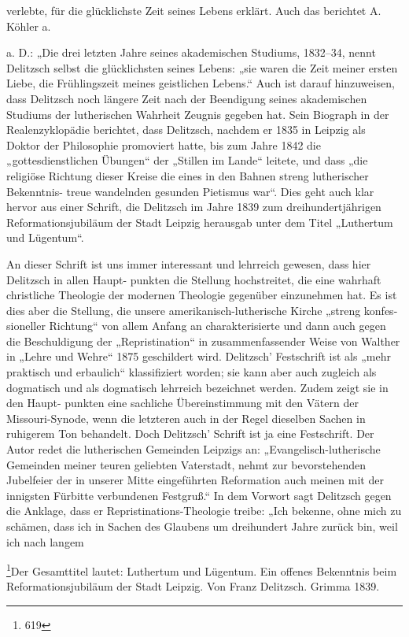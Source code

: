 verlebte, für die glücklichste Zeit seines Lebens erklärt. Auch das berichtet A. Köhler a.

a.
D.: „Die drei letzten Jahre seines akademischen Studiums, 1832–34, nennt Delitzsch selbst
die glücklichsten seines Lebens: „sie waren die Zeit meiner ersten Liebe, die Frühlingszeit meines
geistlichen Lebens.“ Auch ist darauf hinzuweisen, dass Delitzsch noch längere Zeit nach der Beendigung
seines akademischen Studiums der lutherischen Wahrheit Zeugnis gegeben hat. Sein Biograph in der
Realenzyklopädie berichtet, dass Delitzsch, nachdem er 1835 in Leipzig als Doktor der Philosophie
promoviert hatte, bis zum Jahre 1842 die „gottesdienstlichen Übungen“ der „Stillen im Lande“ leitete,
und dass „die religiöse Richtung dieser Kreise die eines in den Bahnen streng lutherischer Bekenntnis-
treue wandelnden gesunden Pietismus war“. Dies geht auch klar hervor aus einer Schrift, die Delitzsch
im Jahre 1839 zum dreihundertjährigen Reformationsjubiläum der Stadt Leipzig herausgab unter dem
Titel „Luthertum und Lügentum“.

An dieser Schrift ist uns immer interessant und lehrreich gewesen, dass hier Delitzsch in allen Haupt-
punkten die Stellung hochstreitet, die eine wahrhaft christliche Theologie der modernen Theologie gegenüber
einzunehmen hat. Es ist dies aber die Stellung, die unsere amerikanisch-lutherische Kirche „streng konfes-
sioneller Richtung“ von allem Anfang an charakterisierte und dann auch gegen die Beschuldigung der
„Repristination“ in zusammenfassender Weise von Walther in „Lehre und Wehre“ 1875 geschildert
wird. Delitzsch’ Festschrift ist als „mehr praktisch und erbaulich“ klassifiziert worden; sie kann aber auch
zugleich als dogmatisch und als dogmatisch lehrreich bezeichnet werden. Zudem zeigt sie in den Haupt-
punkten eine sachliche Übereinstimmung mit den Vätern der Missouri-Synode, wenn die letzteren auch in
der Regel dieselben Sachen in ruhigerem Ton behandelt. Doch Delitzsch’ Schrift ist ja eine Festschrift.
Der Autor redet die lutherischen Gemeinden Leipzigs an: „Evangelisch-lutherische Gemeinden meiner
teuren geliebten Vaterstadt, nehmt zur bevorstehenden Jubelfeier der in unserer Mitte eingeführten
Reformation auch meinen mit der innigsten Fürbitte verbundenen Festgruß.“ In dem Vorwort sagt
Delitzsch gegen die Anklage, dass er Repristinations-Theologie treibe: „Ich bekenne, ohne mich zu schämen,
dass ich in Sachen des Glaubens um dreihundert Jahre zurück bin, weil ich nach langem

\footnote{619}{Der Gesamttitel lautet: Luthertum und Lügentum. Ein offenes Bekenntnis beim Reformationsjubiläum der Stadt Leipzig. Von Franz Delitzsch. Grimma 1839.}
